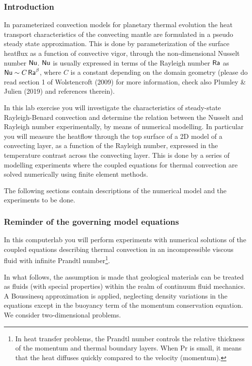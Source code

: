
\subsubsection{Introduction}

In parameterized convection models for planetary thermal evolution the heat transport characteristics 
of the convecting mantle are formulated in a pseudo steady state approximation. 
This is done by parameterization of the surface heatflux as a function of convective vigor, 
through the non-dimensional Nusselt number ${\mathsf{Nu}}$. 
${\mathsf{Nu}}$ is usually expressed in terms of the 
Rayleigh number ${\mathsf{Ra}}$ as ${\mathsf{Nu}} \sim C\, {\mathsf{Ra}}^\beta$, where $C$ is a 
constant depending on the domain geometry
(please do read section 1 of Wolstencroft \etal (2009) \cite{wodd09} 
for more information, check also Plumley \& Julien (2019) \cite{plju19} and references therein).

In this lab exercise you will investigate the characteristics of steady-state Rayleigh-Benard convection 
and determine the relation between the Nusselt and Rayleigh number experimentally, 
by means of numerical modelling. In particular you will measure the heatflow through the top surface of 
a 2D model of a convecting layer, as a function of the Rayleigh number, expressed in the temperature 
contrast across the convecting layer. 
This is done by a series of modelling experiments where the coupled equations for thermal convection are solved 
numerically using finite element methods.

The following sections contain descriptions of the numerical model and the experiments to be done. 

\subsubsection{Reminder of the governing model equations}

In this computerlab you will perform experiments with numerical solutions of the 
coupled equations describing thermal convection in an 
incompressible viscous fluid with infinite Prandtl number\footnote{In heat transfer problems, 
the Prandtl number controls the relative thickness of 
the momentum and thermal boundary layers. When Pr is small, it means that the heat diffuses 
quickly compared to the velocity (momentum).}.

In what follows, the assumption is made that geological materials can be treated as fluids (with 
special properties) within the realm of continuum fluid mechanics.
A Boussinesq approximation is applied, neglecting density variations in the equations except 
in the buoyancy term of the momentum conservation equation. We consider two-dimensional problems.

